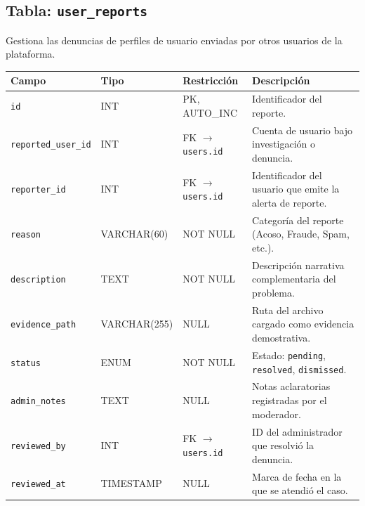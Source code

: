 \documentclass[11pt,a4paper]{report}
\begin{document}
\subsection{Tabla: \texttt{user\_reports}}
Gestiona las denuncias de perfiles de usuario enviadas por otros usuarios de la plataforma.
\begin{table}[H]
\centering
\begin{tabularx}{\textwidth}{|l|l|l|L|}
\hline
{}\textbf{Campo} & \textbf{Tipo} & \textbf{Restricción} & \textbf{Descripción} \\ \hline
\texttt{id} & INT & PK, AUTO\_INC & Identificador del reporte. \\ \hline
\texttt{reported\_user\_id} & INT & FK $\rightarrow$ \texttt{users.id} & Cuenta de usuario bajo investigación o denuncia. \\ \hline
\texttt{reporter\_id} & INT & FK $\rightarrow$ \texttt{users.id} & Identificador del usuario que emite la alerta de reporte. \\ \hline
\texttt{reason} & VARCHAR(60) & NOT NULL & Categoría del reporte (Acoso, Fraude, Spam, etc.). \\ \hline
\texttt{description} & TEXT & NOT NULL & Descripción narrativa complementaria del problema. \\ \hline
\texttt{evidence\_path} & VARCHAR(255) & NULL & Ruta del archivo cargado como evidencia demostrativa. \\ \hline
\texttt{status} & ENUM & NOT NULL & Estado: \texttt{pending}, \texttt{resolved}, \texttt{dismissed}. \\ \hline
\texttt{admin\_notes} & TEXT & NULL & Notas aclaratorias registradas por el moderador. \\ \hline
\texttt{reviewed\_by} & INT & FK $\rightarrow$ \texttt{users.id} & ID del administrador que resolvió la denuncia. \\ \hline
\texttt{reviewed\_at} & TIMESTAMP & NULL & Marca de fecha en la que se atendió el caso. \\ \hline
\end{tabularx}
\end{table}
\end{document}

